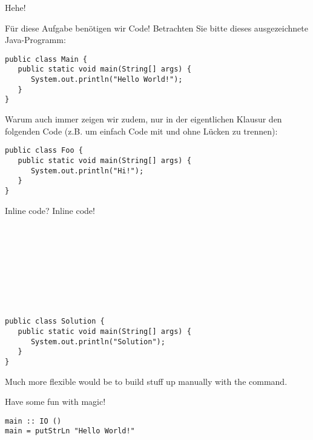 \begin{exercise}[5]{Hehe!}
\label{ex:second}%

Für diese Aufgabe benötigen wir Code!
Betrachten Sie bitte dieses ausgezeichnete Java-Programm:

\begin{verbatim}
public class Main {
   public static void main(String[] args) {
      System.out.println("Hello World!");
   }
}
\end{verbatim}

\begin{examonly}
Warum auch immer zeigen wir zudem, nur in der eigentlichen Klausur den folgenden Code (z.B. um einfach Code mit und ohne Lücken zu trennen):

\begin{verbatim}
public class Foo {
   public static void main(String[] args) {
      System.out.println("Hi!");
   }
}
\end{verbatim}
\bigskip

\IndentGuides{9cm}

\IndentGuidesDistance{0.5cm}
\IndentGuides[4]{5cm}

\end{examonly}


Inline code? Inline code!

\\
\\
\\
\\
\\
\\
\\

\begin{solution}
\begin{verbatim}
public class Solution {
   public static void main(String[] args) {
      System.out.println("Solution");
   }
}
\end{verbatim}
\end{solution}

Much more flexible would be to build stuff up manually with the \string\ifinmode\space command.

\begin{solutionbox}
   Have some fun with magic!

\begin{verbatim}
main :: IO ()
main = putStrLn "Hello World!"
\end{verbatim}
\end{solutionbox}
\fi

\end{exercise}
